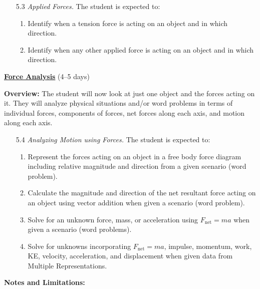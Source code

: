 \documentclass[dvipsnames]{article}
\begin{document}
\begin{enumerate}[topsep=0pt]
\begin{enumerate}[topsep=0pt,itemsep=0pt]
    \end{enumerate}
    \item[5.3] \textit{Applied Forces.} The student is expected to:
    \begin{enumerate}[topsep=0pt,itemsep=0pt]
        \item Identify when a tension force is acting on an object and in which direction.
        \item Identify when any other applied force is acting on an object and in which direction.
    \end{enumerate}
\end{enumerate}

\textbf{\underline{Force Analysis}} (4--5 days)

\textbf{Overview:} The student will now look at just one object and the forces acting on it. They will analyze physical situations and/or word problems in terms of individual forces, components of forces, net forces along each axis, and motion along each axis.

\begin{enumerate}[topsep=0pt]
    \item[5.4] \textit{Analyzing Motion using Forces.} The student is expected to:
    \begin{enumerate}[topsep=0pt,itemsep=0pt]
        \item Represent the forces acting on an object in a free body force diagram including relative magnitude and direction from a given scenario (word problem).
        \item Calculate the magnitude and direction of the net resultant force acting on an object using vector addition when given a scenario (word problem).
        \item Solve for an unknown force, mass, or acceleration using $F_\mathrm{net}=ma$ when given a scenario (word problems).
        \item Solve for unknowns incorporating $F_\mathrm{net}=ma$, impulse, momentum, work, KE, velocity, acceleration, and displacement when given data from Multiple Representations.
    \end{enumerate}
\end{enumerate}

\textbf{Notes and Limitations:}
\end{document}
